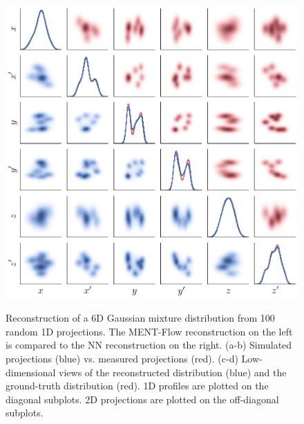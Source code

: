 \documentclass[%
    reprint,
    twocolumn,
    nofootinbib,
    amsmath,
    amssymb,
    aps,
    prstab,
]{revtex4-2}
\begin{document}
\begin{figure}
{        \includegraphics[width=\columnwidth]{fig_rec_nd_1d_flow_gaussian_mixture_100-proj_corner_11.pdf}%
        \label{fig:rec_6d_1d_gmm_100meas-c}%
    }%
    \hfill
    \caption{Reconstruction of a 6D Gaussian mixture distribution from 100 random 1D projections. The MENT-Flow reconstruction on the left is compared to the NN reconstruction on the right. (a-b) Simulated projections (blue) vs. measured projections (red). (c-d) Low-dimensional views of the reconstructed distribution (blue) and the ground-truth distribution (red). 1D profiles are plotted on the diagonal subplots. 2D projections are plotted on the off-diagonal subplots.}
    \label{fig:rec_6d_1d_gmm_100meas}
\end{figure}
\end{document}
